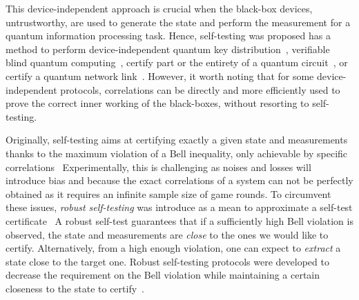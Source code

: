 This device-independent approach is crucial when the black-box devices, untrustworthy, are used to generate the state and perform the measurement for a quantum information processing task.
Hence, self-testing was proposed has a method to perform device-independent quantum key distribution~\cite{Mayers2004}, verifiable blind quantum computing~\cite{Gheorghiu2015,Gheorghiu2017}, certify part or the entirety of a quantum circuit~\cite{Magniez2006,Sekatski2018}, or certify a quantum network link~\cite{Bancal2021}.
However, it worth noting that for some device-independent protocols, correlations can be directly and more efficiently used to prove the correct inner working of the black-boxes, without resorting to self-testing.

\medbreak

Originally, self-testing aims at certifying exactly a given state and measurements thanks to the maximum violation of a Bell inequality, only achievable by specific correlations~\cite{Mayers2004}
Experimentally, this is challenging as noises and losses will introduce bias and because the exact correlations of a system can not be perfectly obtained as it requires an infinite sample size of game rounds.
To circumvent these issues, \textit{robust self-testing} was introduce as a mean to approximate a self-test certificate~\cite{Kaniewski2016}
A robust self-test guarantees that if a sufficiently high Bell violation is observed, the state and measurements are \textit{close} to the ones we would like to certify.
Alternatively, from a high enough violation, one can expect to \textit{extract} a state close to the target one.
Robust self-testing protocols were developed to decrease the requirement on the Bell violation while maintaining a certain closeness to the state to certify~\cite{Bancal2015,Kaniewski2016,Kaniewski2017,Valcarce2022}.
